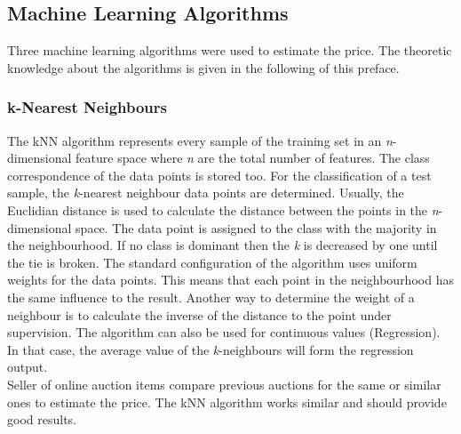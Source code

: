\subsection{Machine Learning Algorithms}
Three machine learning algorithms were used to estimate the price. The theoretic knowledge about the algorithms is given in the following of this preface.
\subsubsection{k-Nearest Neighbours}
The kNN algorithm \cite{knn} represents every sample of the training set in an \textit{n}-dimensional feature space where \textit{n} are the total number of features. The class correspondence of the data points is stored too. For the classification of a test sample, the \textit{k}-nearest neighbour data points are determined. Usually, the Euclidian distance is used to calculate the distance between the points in the \textit{n}-dimensional space. The data point is assigned to the class with the majority in the neighbourhood. If no class is dominant then the \textit{k} is decreased by one until the tie is broken. The standard configuration of the algorithm uses uniform weights for the data points. This means that each point in the neighbourhood has the same influence to the result. Another way to determine the weight of a neighbour is to calculate the inverse of the distance to the point under supervision. The algorithm can also be used for continuous values (Regression). In that case, the average value of the \textit{k}-neighbours will form the regression output.\\
Seller of online auction items compare previous auctions for the same or similar ones to estimate the price. The kNN algorithm works similar and should provide good results. 
